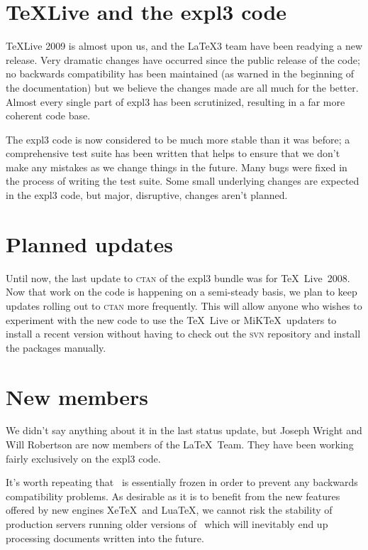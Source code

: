 \documentclass{ltnews}
\begin{document}
\maketitle

\section{\TeX Live and the \textsf{expl3} code}

\TeX Live 2009 is almost upon us, and the \LaTeX3 team have been
readying a new release. Very dramatic changes have occurred since the
public release of the code; no backwards compatibility has been
maintained (as warned in the beginning of the documentation) but we
believe the changes made are all much for the better. Almost every
single part of \textsf{expl3} has been scrutinized, resulting in a far
more coherent code base.

The \textsf{expl3} code is now considered to be much more stable than
it was before; a comprehensive test suite has been written that helps
to ensure that we don't make any mistakes as we change things in the
future. Many bugs were fixed in the process of writing the test
suite. Some small underlying changes are expected in the
\textsf{expl3} code, but major, disruptive, changes aren't planned.

\section{Planned updates}

Until now, the last update to \textsc{ctan} of the \textsf{expl3}
bundle was for \TeX~Live~2008. Now that work on the code is happening
on a semi-steady basis, we plan to keep updates rolling out to
\textsc{ctan} more frequently. This will allow anyone who wishes to
experiment with the new code to use the \TeX~Live or MiK\TeX\ 
updaters to install a recent version without having to check out the
\textsc{svn} repository and install the packages manually.

\section{New members}

We didn't say anything about it in the last status update, but Joseph
Wright and Will Robertson are now members of the \LaTeX\ Team. They
have been working fairly exclusively on the \textsf{expl3} code. 

It's worth repeating that \LaTeXe\ is essentially frozen in order to
prevent any backwards compatibility problems. As desirable as it is
to benefit from the new features offered by new engines Xe\TeX\ and
Lua\TeX, we cannot risk the stability of production servers running
older versions of \LaTeXe\ which will inevitably end up processing
documents written into the future.
\end{document}
